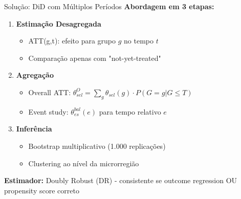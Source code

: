 \documentclass[10pt,aspectratio=169]{beamer}
\begin{document}
\begin{frame}{Solução: DiD com Múltiplos Períodos}
\textbf{Abordagem em 3 etapas:}

\vspace{0.3cm}
\begin{enumerate}
    \item \textbf{Estimação Desagregada}
    \begin{itemize}
        \item ATT(g,t): efeito para grupo $g$ no tempo $t$
        \item Comparação apenas com "not-yet-treated"
    \end{itemize}
    
    \vspace{0.3cm}
    \item \textbf{Agregação}
    \begin{itemize}
        \item Overall ATT: $\theta_{sel}^O = \sum_g \theta_{sel}(g) \cdot P(G=g|G \leq T)$
        \item Event study: $\theta_{es}^{bal}(e)$ para tempo relativo $e$
    \end{itemize}
    
    \vspace{0.3cm}
    \item \textbf{Inferência}
    \begin{itemize}
        \item Bootstrap multiplicativo (1.000 replicações)
        \item Clustering ao nível da microrregião
    \end{itemize}
\end{enumerate}

\vspace{0.3cm}
\textbf{Estimador:} Doubly Robust (DR) - consistente se outcome regression OU propensity score correto
\end{frame}
\end{document}
